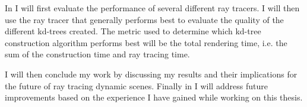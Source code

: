 
In  I will first evaluate the performance of several
different ray tracers. I will then use the ray tracer that generally performs
best to evaluate the quality of the different kd-trees created. The metric used
to determine which kd-tree construction algorithm performs best will be the
total rendering time, i.e. the sum of the construction time and ray tracing
time.


I will then conclude my work by discussing my results and their implications for
the future of ray tracing dynamic scenes. Finally in  I
will address future improvements based on the experience I have gained while
working on this thesis.

